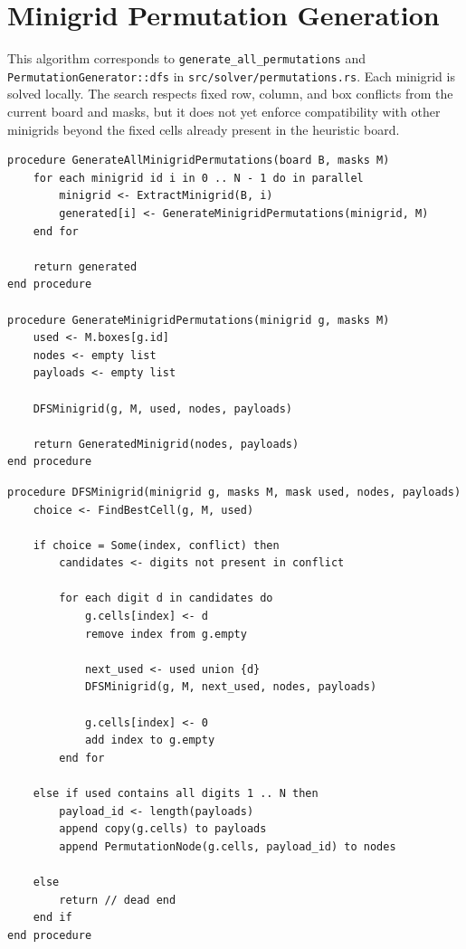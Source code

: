 \documentclass[11pt,a4paper]{article}
\begin{document}
\section{Minigrid Permutation Generation}

This algorithm corresponds to \texttt{generate\_all\_permutations} and \texttt{PermutationGenerator::dfs} in \texttt{src/solver/permutations.rs}. Each minigrid is solved locally. The search respects fixed row, column, and box conflicts from the current board and masks, but it does not yet enforce compatibility with other minigrids beyond the fixed cells already present in the heuristic board.

\begin{lstlisting}[caption={Generate all minigrid permutations}]
procedure GenerateAllMinigridPermutations(board B, masks M)
    for each minigrid id i in 0 .. N - 1 do in parallel
        minigrid <- ExtractMinigrid(B, i)
        generated[i] <- GenerateMinigridPermutations(minigrid, M)
    end for

    return generated
end procedure

procedure GenerateMinigridPermutations(minigrid g, masks M)
    used <- M.boxes[g.id]
    nodes <- empty list
    payloads <- empty list

    DFSMinigrid(g, M, used, nodes, payloads)

    return GeneratedMinigrid(nodes, payloads)
end procedure
\end{lstlisting}

\begin{lstlisting}[caption={Depth-first minigrid completion with MRV}]
procedure DFSMinigrid(minigrid g, masks M, mask used, nodes, payloads)
    choice <- FindBestCell(g, M, used)

    if choice = Some(index, conflict) then
        candidates <- digits not present in conflict

        for each digit d in candidates do
            g.cells[index] <- d
            remove index from g.empty

            next_used <- used union {d}
            DFSMinigrid(g, M, next_used, nodes, payloads)

            g.cells[index] <- 0
            add index to g.empty
        end for

    else if used contains all digits 1 .. N then
        payload_id <- length(payloads)
        append copy(g.cells) to payloads
        append PermutationNode(g.cells, payload_id) to nodes

    else
        return // dead end
    end if
end procedure
\end{lstlisting}
\end{document}
